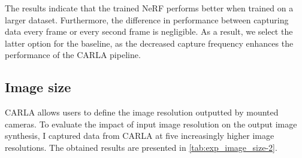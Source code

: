 The results indicate that the trained NeRF performs better when trained on a larger dataset. Furthermore, the difference in performance between capturing data every frame or every second frame is negligible. As a result, we select the latter option for the baseline, as the decreased capture frequency enhances the performance of the CARLA pipeline.










\subsection{Image size} \label{sec:exp-image-resolution}
CARLA allows users to define the image resolution outputted by mounted cameras. To evaluate the impact of input image resolution on the output image synthesis, I captured data from CARLA at five increasingly higher image resolutions. The obtained results are presented in \autoref{tab:exp_image_size-2}.

